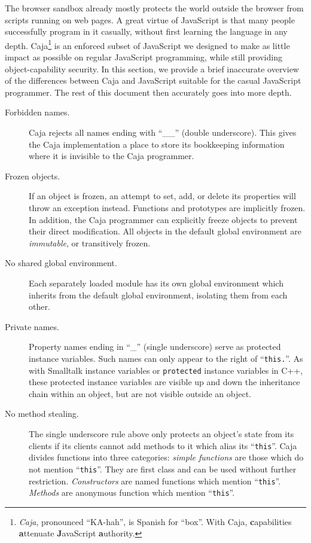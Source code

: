 \documentclass[letterpaper,twocolumn,10pt]{article}
\newcommand{\code}[1]{{\tt {#1}}}              %
\begin{document}
The browser sandbox already mostly protects the world outside the browser 
from scripts running on web pages. A great virtue of JavaScript is that many 
people successfully program in it casually, without first learning the 
language in any depth. Caja\footnote{
%
\emph{Caja}, pronounced ``KA-hah'', is Spanish for ``box''. With Caja, 
\textbf{c}apabilities \textbf{a}ttenuate \textbf{J}avaScript 
\textbf{a}uthority.
%
} is an enforced subset of JavaScript we designed to make as little impact as 
possible on regular JavaScript programming, while still providing 
object-capability security. In this section, we provide a brief inaccurate 
overview of the differences between Caja and JavaScript suitable for the 
casual JavaScript programmer. The rest of this document then accurately goes 
into more depth.

\begin{description}

  \item[Forbidden names.] Caja rejects all names ending with ``\_\_'' (double 
  underscore). This gives the Caja implementation a place to store its 
  bookkeeping information where it is invisible to the Caja programmer.
 
  \item[Frozen objects.] If an object is frozen, an attempt to set, add, or 
  delete its properties will throw an exception instead. Functions and 
  prototypes are implicitly frozen. In addition, the Caja programmer can 
  explicitly freeze objects to prevent their direct modification. All objects 
  in the default global environment are \emph{immutable}, or transitively 
  frozen.
 
  \item[No shared global environment.] Each separately loaded module has its 
  own global environment which inherits from the default global environment, 
  isolating them from each other.

  \item[Private names.] Property names ending in ``\_'' (single underscore) 
  serve as protected instance variables. Such names can only appear to the 
  right of ``\code{this.}''. As with Smalltalk instance variables or 
  \code{protected} instance variables in C++, these protected instance 
  variables are visible up and down the inheritance chain within an object, 
  but are not visible outside an object.
 
  \item[No method stealing.] The single underscore rule above only protects 
  an object's state from its clients if its clients cannot add methods to it 
  which alias its ``\code{this}''. Caja divides functions into three 
  categories: \emph{simple functions} are those which do not mention 
  ``\code{this}''. They are first class and can be used without further 
  restriction. \emph{Constructors} are named functions which mention 
  ``\code{this}''. \emph{Methods} are anonymous function which mention 
  ``\code{this}''.


\end{description}
\end{document}
